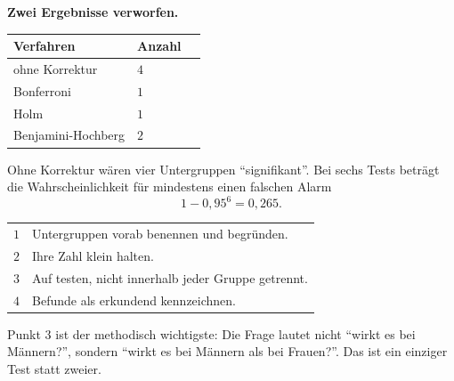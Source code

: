 \begin{aufgabe}
\textbf{Zwei Ergebnisse verworfen.}

\begin{center}
\renewcommand{\arraystretch}{1.48}
\begin{tabular}{@{}P{3.0cm}P{2.0cm}P{2.4cm}@{}}
\toprule
\textbf{Verfahren} & \textbf{Anzahl} & \\
\midrule
ohne Korrektur & $4$ & \\
Bonferroni & $1$ & \\
Holm & $1$ & \\
Benjamini-Hochberg & $2$ & \\
\bottomrule
\end{tabular}
\end{center}

Ohne Korrektur wären vier Untergruppen \enquote{signifikant}. Bei sechs Tests beträgt die Wahrscheinlichkeit für mindestens einen falschen Alarm
\[ 1 - 0{,}95^6 = 0{,}265 . \]

\begin{center}
\begin{minipage}{0.86\textwidth}
\end{minipage}
\end{center}

\begin{center}
\renewcommand{\arraystretch}{1.48}
\begin{tabular}{@{}P{1.0cm}P{7.4cm}@{}}
\toprule
$1$ & Untergruppen vorab benennen und begründen.\\
$2$ & Ihre Zahl klein halten.\\
$3$ & Auf  testen, nicht innerhalb jeder Gruppe getrennt.\\
$4$ & Befunde als erkundend kennzeichnen.\\
\bottomrule
\end{tabular}
\end{center}

Punkt $3$ ist der methodisch wichtigste: Die Frage lautet nicht \enquote{wirkt es bei Männern?}, sondern \enquote{wirkt es bei Männern  als bei Frauen?}. Das ist ein einziger Test statt zweier.
\end{aufgabe}

